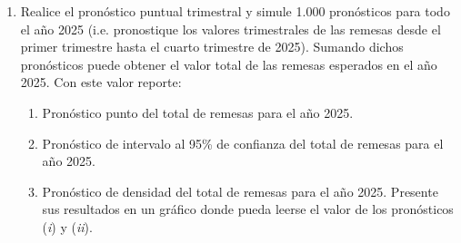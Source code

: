 \documentclass{article}
\theoremstyle{remark}
\theoremstyle{definition}
\begin{document}
\begin{enumerate}[label=\emph{\alph*})]
\begin{tcolorbox}[title=Soluci\'on 3.h]
        \end{tcolorbox}
    \item {Realice el pron\'ostico puntual trimestral y simule 1.000 pron\'osticos para todo el año 2025 (i.e. pronostique los valores trimestrales de las remesas desde el primer trimestre hasta el cuarto trimestre de 2025). Sumando dichos pron\'osticos puede obtener el valor total de las remesas esperados en el año 2025. Con este valor reporte:}
    \begin{enumerate}[label=(\emph{\roman*})]
        \item {Pron\'ostico punto del total de remesas para el año 2025.}
            \begin{tcolorbox}[title=Soluci\'on 3.i.i]
            
            \end{tcolorbox}
        \item {Pron\'ostico de intervalo al 95\% de confianza del total de remesas para el año 2025.}
            \begin{tcolorbox}[title=Soluci\'on 3.i.ii]
            
            \end{tcolorbox}
        \item {Pron\'ostico de densidad del total de remesas para el año 2025. Presente sus resultados en un gr\'afico donde pueda leerse el valor de los pron\'osticos (\emph{i}) y (\emph{ii}).}
            \begin{tcolorbox}[title=Soluci\'on 3.i.iii]
            
            \end{tcolorbox}
    \end{enumerate}
\end{enumerate}

\nocite{*}

\printbibliography
\end{document}
